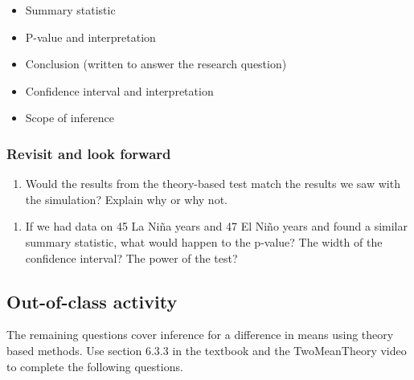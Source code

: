 \documentclass[
]{report}
\providecommand{\tightlist}{%
  \setlength{\itemsep}{0pt}\setlength{\parskip}{0pt}}
\newcommand\latexcode[1]{#1}
\begin{document}
\begin{itemize}
\item
  Summary statistic
\item
  P-value and interpretation
\item
  Conclusion (written to answer the research question)
\item
  Confidence interval and interpretation
\item
  Scope of inference
\end{itemize}

\vspace{3in}

\hypertarget{revisit-and-look-forward-3}{%
\subsubsection*{Revisit and look forward}\label{revisit-and-look-forward-3}}

\begin{enumerate}
\def\labelenumi{\arabic{enumi}.}
\setcounter{enumi}{20}
\tightlist
\item
  Would the results from the theory-based test match the results we saw with the simulation? Explain why or why not.
\end{enumerate}

\vspace{1in}

\begin{enumerate}
\def\labelenumi{\arabic{enumi}.}
\setcounter{enumi}{21}
\tightlist
\item
  If we had data on 45 La Ni\latexcode{\~{n}}a years and 47 El Ni\latexcode{\~{n}}o years and found a similar summary statistic, what would happen to the p-value? The width of the confidence interval? The power of the test?
\end{enumerate}

\vspace{1in}

\hypertarget{out-of-class-activity-10}{%
\subsection{Out-of-class activity}\label{out-of-class-activity-10}}

The remaining questions cover inference for a difference in means using theory based methods. Use section 6.3.3 in the textbook and the TwoMeanTheory video to complete the following questions.
\end{document}
